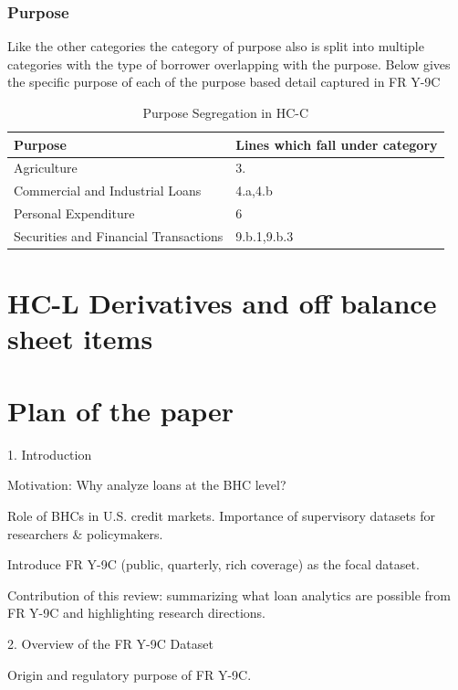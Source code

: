 \documentclass[conference]{IEEEtran}
\begin{document}
        \subsubsection{Purpose}
             Like the other categories the category of purpose also is split into multiple categories with the type of borrower overlapping with the purpose. Below gives the specific purpose of each of the purpose based detail captured in FR Y-9C
             \begin{table}[htbp]
             	\centering
             	\caption{Purpose Segregation in HC-C}
             	\begin{tabular}{|p{3.5cm}|p{4cm}|}
             		\hline
             		\textbf{Purpose} & \textbf{Lines which fall under category} \\
             		\hline
             		Agriculture & 3. \\
             		\hline
             		Commercial and Industrial Loans & 4.a,4.b \\
             		\hline
             		Personal Expenditure & 6 \\
             		\hline
             		Securities and Financial Transactions & 9.b.1,9.b.3\\
             		\hline
             	\end{tabular}
             \end{table}
            		
            
\section{HC-L Derivatives and off balance sheet items}
    

\section{Plan of the paper}
1. Introduction

Motivation: Why analyze loans at the BHC level?

Role of BHCs in U.S. credit markets.
Importance of supervisory datasets for researchers \& policymakers.

Introduce FR Y-9C (public, quarterly, rich coverage) as the focal dataset.

Contribution of this review: summarizing what loan analytics are possible from FR Y-9C and highlighting research directions.

2. Overview of the FR Y-9C Dataset

Origin and regulatory purpose of FR Y-9C.
\end{document}
